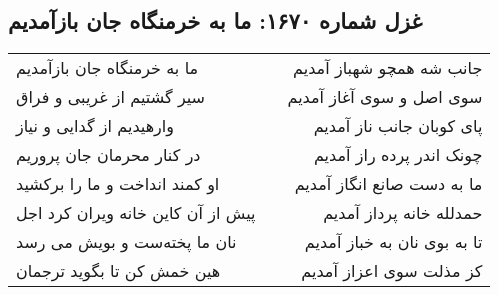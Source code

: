 \begin{center}
\section*{غزل شماره ۱۶۷۰: ما به خرمنگاه جان بازآمدیم}
\label{sec:1670}
\begin{longtable}{l p{0.5cm} r}
ما به خرمنگاه جان بازآمدیم
&&
جانب شه همچو شهباز آمدیم
\\
سیر گشتیم از غریبی و فراق
&&
سوی اصل و سوی آغاز آمدیم
\\
وارهیدیم از گدایی و نیاز
&&
پای کوبان جانب ناز آمدیم
\\
در کنار محرمان جان پروریم
&&
چونک اندر پرده راز آمدیم
\\
او کمند انداخت و ما را برکشید
&&
ما به دست صانع انگاز آمدیم
\\
پیش از آن کاین خانه ویران کرد اجل
&&
حمدلله خانه پرداز آمدیم
\\
نان ما پخته‌ست و بویش می رسد
&&
تا به بوی نان به خباز آمدیم
\\
هین خمش کن تا بگوید ترجمان
&&
کز مذلت سوی اعزاز آمدیم
\\
\end{longtable}
\end{center}
